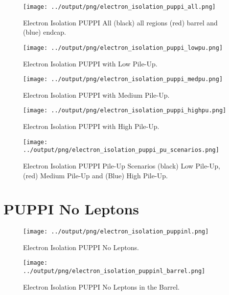 \documentclass[11pt]{book}
\begin{document}
\begin{figure}[htbp]
\centering
\texttt{[image: ../output/png/electron\_isolation\_puppi\_all.png]}
\caption{Electron Isolation PUPPI All (black) all regions (red) barrel and (blue) endcap.}
\label{fig:electron_isolation_puppi_all}
\end{figure}

\begin{figure}[htbp]
\centering
\texttt{[image: ../output/png/electron\_isolation\_puppi\_lowpu.png]}
\caption{Electron Isolation PUPPI with Low Pile-Up.}
\label{fig:electron_isolation_puppi_lowpu}
\end{figure}

\begin{figure}[htbp]
\centering
\texttt{[image: ../output/png/electron\_isolation\_puppi\_medpu.png]}
\caption{Electron Isolation PUPPI with Medium Pile-Up.}
\label{fig:electron_isolation_puppi_medpu}
\end{figure}

\begin{figure}[htbp]
\centering
\texttt{[image: ../output/png/electron\_isolation\_puppi\_highpu.png]}
\caption{Electron Isolation PUPPI with High Pile-Up.}
\label{fig:electron_isolation_puppi_highpu}
\end{figure}

\begin{figure}[htbp]
\centering
\texttt{[image: ../output/png/electron\_isolation\_puppi\_pu\_scenarios.png]}
\caption{Electron Isolation PUPPI Pile-Up Scenarios (black) Low Pile-Up, (red) Medium Pile-Up and (Blue) High Pile-Up.}
\label{fig:electron_isolation_puppi_pu_scenarios}
\end{figure}
\clearpage

\chapter{PUPPI No Leptons}
\begin{figure}[htbp]
\centering
\texttt{[image: ../output/png/electron\_isolation\_puppinl.png]}
\caption{Electron Isolation PUPPI No Leptons.}
\label{fig:electron_isolation_puppinl}
\end{figure}

\begin{figure}[htbp]
\centering
\texttt{[image: ../output/png/electron\_isolation\_puppinl\_barrel.png]}
\caption{Electron Isolation PUPPI No Leptons in the Barrel.}
\label{fig:electron_isolation_puppinl_barrel}
\end{figure}
\end{document}
